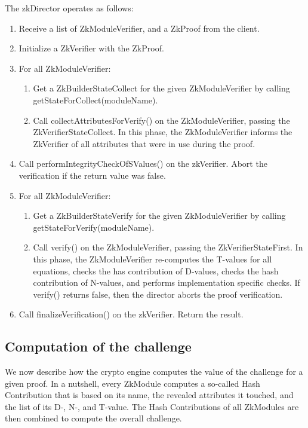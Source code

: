   The zkDirector operates as follows:
  \begin{enumerate}
    \item Receive a list of ZkModuleVerifier, and a ZkProof from the client.
    \item Initialize a ZkVerifier with the ZkProof.
    \item For all ZkModuleVerifier:
      \begin{enumerate}
        \item Get a ZkBuilderStateCollect for the given ZkModuleVerifier by calling getStateForCollect(moduleName).
        \item Call collectAttributesForVerify() on the ZkModuleVerifier, passing the ZkVerifierStateCollect. In this phase, the ZkModuleVerifier
          informs the ZkVerifier of all attributes that were in use during the proof.
      \end{enumerate}

    \item Call performIntegrityCheckOfSValues() on the zkVerifier. Abort the verification if the return value was false.
    \item For all ZkModuleVerifier:
      \begin{enumerate}
        \item Get a ZkBuilderStateVerify for the given ZkModuleVerifier by calling getStateForVerify(moduleName).
        \item Call verify() on the ZkModuleVerifier, passing the ZkVerifierStateFirst. In this phase, the ZkModuleVerifier re-computes the T-values for all equations, checks
        the has contribution of D-values, checks the hash contribution of N-values, and performs implementation specific checks. If verify() returns false, then
        the director aborts the proof verification.
      \end{enumerate}

    \item Call finalizeVerification() on the zkVerifier. Return the result.
  \end{enumerate}

  \subsection{Computation of the challenge}
  We now describe how the crypto engine computes the value of the challenge for a given proof.
  In a nutshell, every ZkModule computes a so-called Hash Contribution that is based on its
  name, the revealed attributes it touched, and the list of its D-, N-, and T-value.
  The Hash Contributions of all ZkModules are then combined to compute the overall challenge.

